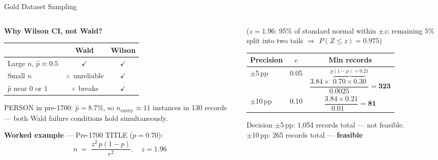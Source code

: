 \documentclass[xcolor,aspectratio=169,compress]{beamer}
\begin{document}
\begin{frame}{Gold Dataset Sampling}
  \small
  \begin{columns}
    \begin{column}{.48\textwidth}
      \textbf{Why Wilson CI, not Wald?}
      \begin{center}\footnotesize
      \begin{tabular}{lcc}
        \toprule
         & Wald & Wilson \\
        \midrule
        Large $n$, $\hat{p}\approx0.5$ & \textcolor{green!60!black}{$\checkmark$} & \textcolor{green!60!black}{$\checkmark$} \\
        Small $n$                       & \textcolor{red}{$\times$} unreliable    & \textcolor{green!60!black}{$\checkmark$} \\
        $\hat{p}$ near 0 or 1           & \textcolor{red}{$\times$} breaks        & \textcolor{green!60!black}{$\checkmark$} \\
        \bottomrule
      \end{tabular}
      \end{center}
      \smallskip
      PERSON in pre-1700: $\hat{p}=8.7\%$, so $n_{\text{entity}}\approx11$ instances in 130 records
      --- both Wald failure conditions hold simultaneously.

      \textbf{Worked example} --- Pre-1700 TITLE ($p=0.70$):
      \[
        n \;=\; \frac{z^{2}\,p(1-p)}{e^{2}}, \quad z=1.96
      \]

    \end{column}
    \begin{column}{.50\textwidth}
      \begin{center}\footnotesize
      \footnotesize($z=1.96$: 95\% of standard normal within $\pm z$; remaining 5\% split into two tails $\Rightarrow$ $P(Z\leq z)=0.975$)
      \begin{tabular}{lcc}
        \toprule
        Precision & $e$ & Min records \\
        \midrule
        $\pm$5\,pp  & 0.05 & $\dfrac{3.84\times\overbrace{0.70\times0.30}^{p(1-p)=0.21}}{0.0025}=\mathbf{323}$ \\[8pt]
        $\pm$10\,pp & 0.10 & $\dfrac{3.84\times0.21}{0.01\phantom{00}}=\mathbf{81}$ \\
        \bottomrule
      \end{tabular}
      \end{center}
      \begin{alertblock}{Decision}
        $\pm$5\,pp: 1,054 records total --- not feasible. \\
        $\pm$10\,pp: 265 records total --- \textbf{feasible}
      \end{alertblock}
    \end{column}
  \end{columns}
\end{frame}
\end{document}
